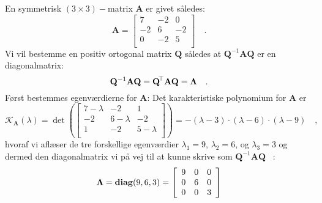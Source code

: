 \begin{example} \label{exampLAbog8.22}
En symmetrisk $(3 \times 3)-$matrix $\mathbf{A}$ er givet således:
\begin{equation}
\mathbf{A} = \left[
               \begin{array}{rrr}
                 7 & -2 & 0 \\
                 -2 & 6 & -2 \\
                 0 & -2 & 5 \\
               \end{array}
             \right] \quad .
\end{equation}
Vi vil bestemme en positiv ortogonal matrix $\mathbf{Q}$ således at $\mathbf{Q}^{-1}\mathbf{A}\mathbf{Q}$ er en diagonalmatrix:
\begin{equation}
\mathbf{Q}^{-1}\mathbf{A}\mathbf{Q} = \mathbf{Q}\hspace*{-.6mm}^{\top}\mathbf{A}\mathbf{Q} =  \bm{\Lambda} \quad .
\end{equation}
Først bestemmes egenværdierne for $\mathbf{A}$: Det karakteristiske polynomium for $\mathbf{A}$ er
\begin{equation}
\mathcal{K}_{\mathbf{A}}(\lambda) = \det\left(\left[
               \begin{array}{rrr}
                 7-\lambda & -2 & 1 \\
                 -2 & 6-\lambda  & -2 \\
                 1 & -2 & 5-\lambda  \\
               \end{array}
             \right] \right)  = -(\lambda-3)\cdot(\lambda-6)\cdot(\lambda - 9) \quad ,
\end{equation}
hvoraf vi aflæser de tre forskellige egenværdier $\lambda_{1}= 9$, $\lambda_{2}= 6$, og $\lambda_{3}= 3$ og dermed
den diagonalmatrix vi på vej til at kunne skrive som $\mathbf{Q}^{-1}\mathbf{A}\mathbf{Q}$ \, :
\begin{equation}
\bm{\Lambda} = \operatorname{\bf{diag}}(9, 6, 3) = \left[
                                  \begin{array}{rrr}
                                    9 & 0 & 0 \\
                                    0 & 6 & 0 \\
                                    0 & 0 & 3 \\
                                  \end{array}
                                \right]
\end{equation}

\end{example}
